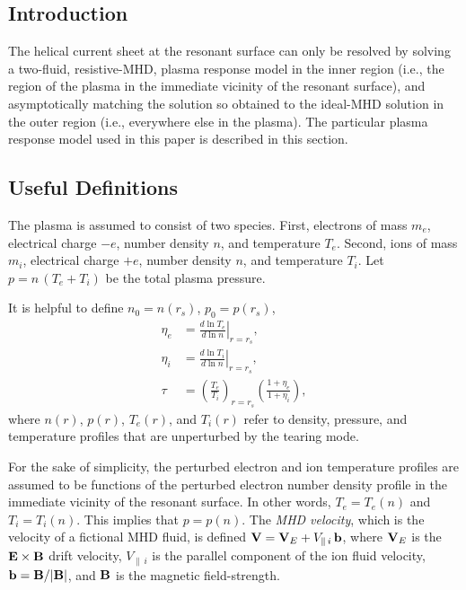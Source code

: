 \documentclass[12pt,prb,aps]{revtex4-1}
\begin{document}
\subsection{Introduction}
The helical current sheet at the resonant surface can only be resolved by solving  a two-fluid, resistive-MHD, plasma response model
in the inner region (i.e., the region of the plasma in the immediate vicinity of the resonant surface), 
and asymptotically matching the solution so obtained to the ideal-MHD solution in the outer region (i.e., everywhere else in the plasma). The particular 
plasma response model used in this paper is
described in this section. 

\subsection{Useful Definitions}
The plasma is assumed to consist of two species. First, electrons of mass $m_e$, electrical charge $-e$, 
number density $n$, and temperature $T_e$.  Second, ions of mass $m_i$, electrical charge $+e$,  
number density $n$, and temperature $T_i$. Let $p=n\,(T_e+T_i)$ be the total plasma pressure. 

It is helpful to define $n_0 = n(r_s)$, $p_0= p(r_s)$,
\begin{align}
\eta_e &=\left.\frac{d\ln T_e}{d\ln n}\right|_{r=r_s},\label{e211}\\[0.5ex]
\eta_i &= \left.\frac{d\ln T_i}{d\ln n}\right|_{r=r_s},\\[0.5ex]
\tau &= \left(\frac{T_e}{T_i}\right)_{r=r_s}\left(\frac{1+\eta_e}{1+\eta_i}\right),\label{e213}
\end{align}
where $n(r)$, $p(r)$, $T_e(r)$, and $T_i(r)$ refer to
density, pressure, and temperature profiles that are unperturbed by the tearing mode. 

For the sake of simplicity, the perturbed electron and ion temperature profiles are assumed to be functions of
the perturbed electron number density profile in the immediate vicinity of the resonant surface. In other words, $T_e=T_e(n)$ and $T_i=T_i(n)$. This
implies that $p=p(n)$. 
The {\em MHD velocity}, which is the velocity of a
fictional MHD fluid, is defined ${\bf V}={\bf V}_E + V_{\parallel\,i}\,{\bf b}$, where ${\bf V}_E$ is the
${\bf E}\times{\bf B}$ drift velocity, $V_{\parallel\,i}$ is the parallel component of the ion fluid
velocity, ${\bf b}= {\bf B}/|{\bf B}|$, and ${\bf B}$ is the magnetic field-strength.
\end{document}

